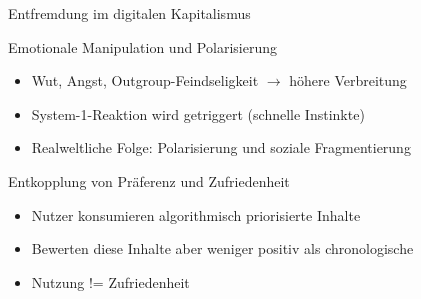 
\begin{frame}{Entfremdung im digitalen Kapitalismus}
\end{frame}

\begin{frame}{Emotionale Manipulation und Polarisierung}
    \begin{itemize}
    \item Wut, Angst, Outgroup-Feindseligkeit $\rightarrow$ höhere Verbreitung
    \item System-1-Reaktion wird getriggert (schnelle Instinkte)
    \item Realweltliche Folge: Polarisierung und soziale Fragmentierung
    \end{itemize}
\end{frame}

\begin{frame}{Entkopplung von Präferenz und Zufriedenheit~\cite{milli_engagement_2024}}
    \begin{itemize}
        \item Nutzer konsumieren algorithmisch priorisierte Inhalte
        \item Bewerten diese Inhalte aber weniger positiv als chronologische
        \item Nutzung != Zufriedenheit
    \end{itemize}
\end{frame}

